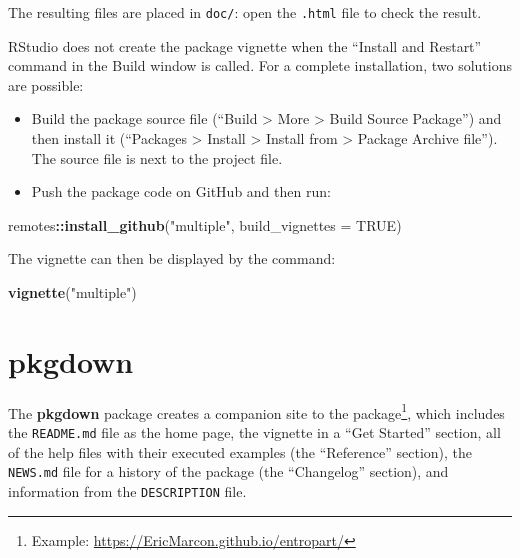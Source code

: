 \documentclass[
  12pt,
  american,
  a4paper,
  extrafontsizes,onecolumn,openright
  ]{memoir}
\newenvironment{Shaded}{\begin{snugshade}}{\end{snugshade}}
\newcommand{\AttributeTok}[1]{\textcolor[rgb]{0.13,0.29,0.53}{#1}}
\newcommand{\ConstantTok}[1]{\textcolor[rgb]{0.56,0.35,0.01}{#1}}
\newcommand{\FunctionTok}[1]{\textcolor[rgb]{0.13,0.29,0.53}{\textbf{#1}}}
\newcommand{\NormalTok}[1]{#1}
\newcommand{\SpecialCharTok}[1]{\textcolor[rgb]{0.81,0.36,0.00}{\textbf{#1}}}
\newcommand{\StringTok}[1]{\textcolor[rgb]{0.31,0.60,0.02}{#1}}
\providecommand{\tightlist}{%
  \setlength{\itemsep}{0pt}\setlength{\parskip}{0pt}}
\begin{document}
\normalsize

The resulting files are placed in \texttt{doc/}: open the \texttt{.html} file to check the result.

RStudio does not create the package vignette when the \enquote{Install and Restart} command in the Build window is called.
For a complete installation, two solutions are possible:

\begin{itemize}
\tightlist
\item
  Build the package source file (\enquote{Build \textgreater{} More \textgreater{} Build Source Package}) and then install it (\enquote{Packages \textgreater{} Install \textgreater{} Install from \textgreater{} Package Archive file}).
  The source file is next to the project file.
\item
  Push the package code on GitHub and then run:
\end{itemize}

\scriptsize

\begin{Shaded}
\begin{Highlighting}[]
\NormalTok{remotes}\SpecialCharTok{::}\FunctionTok{install\_github}\NormalTok{(}\StringTok{"multiple"}\NormalTok{, }\AttributeTok{build\_vignettes =} \ConstantTok{TRUE}\NormalTok{)}
\end{Highlighting}
\end{Shaded}

\normalsize

The vignette can then be displayed by the command:

\scriptsize

\begin{Shaded}
\begin{Highlighting}[]
\FunctionTok{vignette}\NormalTok{(}\StringTok{"multiple"}\NormalTok{)}
\end{Highlighting}
\end{Shaded}

\normalsize

\section{pkgdown}\label{pkgdown}

The \textbf{pkgdown} package creates a companion site to the package\footnote{Example: \url{https://EricMarcon.github.io/entropart/}}, which includes the \texttt{README.md} file as the home page, the vignette in a \enquote{Get Started} section, all of the help files with their executed examples (the \enquote{Reference} section), the \texttt{NEWS.md} file for a history of the package (the \enquote{Changelog} section), and information from the \texttt{DESCRIPTION} file.
\end{document}
